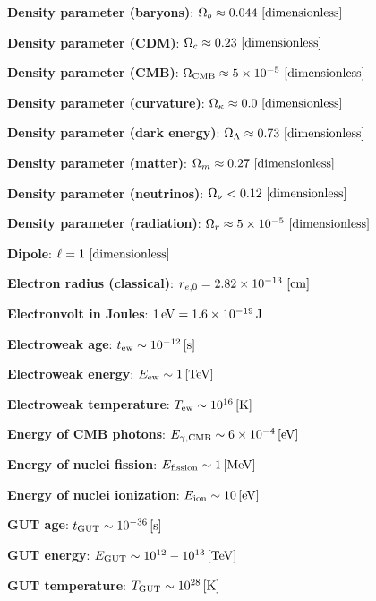 \documentclass[a4paper,10pt]{article}
\begin{document}
{\noindent}\textbf{Density parameter (baryons)}: $\Omega_b \approx 0.044 ~ [{\rm dimensionless}]$

{\noindent}\textbf{Density parameter (CDM)}: $\Omega_c \approx 0.23 ~ [{\rm dimensionless}]$

{\noindent}\textbf{Density parameter (CMB)}: $\Omega_\mathrm{CMB} \approx 5\times10^{-5} ~ [{\rm dimensionless}]$

{\noindent}\textbf{Density parameter (curvature)}: $\Omega_\kappa \approx 0.0 ~ [{\rm dimensionless}]$

{\noindent}\textbf{Density parameter (dark energy)}: $\Omega_\Lambda \approx 0.73 ~ [{\rm dimensionless}]$

{\noindent}\textbf{Density parameter (matter)}: $\Omega_m \approx 0.27 ~ [{\rm dimensionless}]$

{\noindent}\textbf{Density parameter (neutrinos)}: $\Omega_\nu < 0.12 ~ [{\rm dimensionless}]$

{\noindent}\textbf{Density parameter (radiation)}: $\Omega_r \approx 5\times10^{-5} ~ [{\rm dimensionless}]$

{\noindent}\textbf{Dipole}: $\ell=1 ~ [{\rm dimensionless}]$

{\noindent}\textbf{Electron radius (classical)}: $r_{e,0}=2.82\times10^{-13} ~ [{\rm cm}]$

{\noindent}\textbf{Electronvolt in Joules}: $1\,{\rm eV} = 1.6\times10^{-19}\,{\rm J}$

{\noindent}\textbf{Electroweak age}: $t_\mathrm{ew} \sim 10^{-12}\,[{\rm s}]$

{\noindent}\textbf{Electroweak energy}: $E_\mathrm{ew} \sim 1\,[{\rm TeV}]$

{\noindent}\textbf{Electroweak temperature}: $T_\mathrm{ew} \sim 10^{16}\,[{\rm K}]$

{\noindent}\textbf{Energy of CMB photons}: $E_{\gamma,\mathrm{CMB}} \sim 6\times10^{-4}\,[{\rm eV}]$

{\noindent}\textbf{Energy of nuclei fission}: $E_\mathrm{fission} \sim 1\,[{\rm MeV}]$

{\noindent}\textbf{Energy of nuclei ionization}: $E_\mathrm{ion} \sim 10\,[{\rm eV}]$

{\noindent}\textbf{GUT age}: $t_\mathrm{GUT} \sim 10^{-36}\,[{\rm s}]$

{\noindent}\textbf{GUT energy}: $E_\mathrm{GUT} \sim 10^{12}-10^{13}\,[{\rm TeV}]$

{\noindent}\textbf{GUT temperature}: $T_\mathrm{GUT} \sim 10^{28}\,[{\rm K}]$
\end{document}
